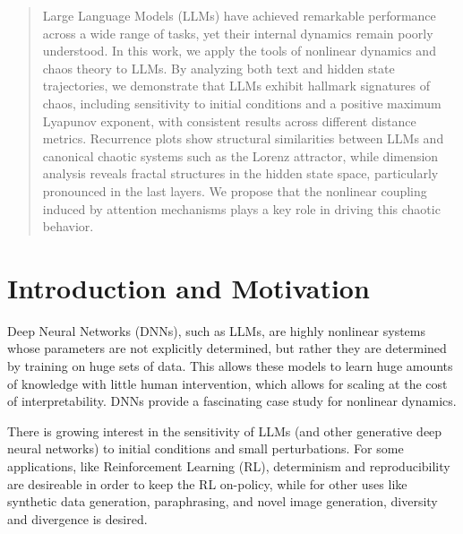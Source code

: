 \documentclass[a4paper,12pt]{article}
\begin{document}
\begin{abstract}
    Large Language Models (LLMs) have achieved remarkable performance across a wide range of tasks, yet their internal dynamics remain poorly understood. In this work, we apply the tools of nonlinear dynamics and chaos theory to LLMs. By analyzing both text and hidden state trajectories, we demonstrate that LLMs exhibit hallmark signatures of chaos, including sensitivity to initial conditions and a positive maximum Lyapunov exponent, with consistent results across different distance metrics. Recurrence plots show structural similarities between LLMs and canonical chaotic systems such as the Lorenz attractor, while dimension analysis reveals fractal structures in the hidden state space, particularly pronounced in the last layers. We propose that the nonlinear coupling induced by attention mechanisms plays a key role in driving this chaotic behavior. 
\end{abstract}
\newpage
{
  \hypersetup{linkcolor=black}
  \tableofcontents
}
\newpage

\section{Introduction and Motivation}
\label{sec:introduction}

Deep Neural Networks (DNNs), such as LLMs, are highly nonlinear systems whose parameters are not explicitly determined, but rather they are determined by training on huge sets of data.
This allows these models to learn huge amounts of knowledge with little human intervention, which allows for scaling at the cost of interpretability.
DNNs provide a fascinating case study for nonlinear dynamics.

There is growing interest in the sensitivity of LLMs (and other generative deep neural networks) to initial conditions and small perturbations. For some applications, like Reinforcement Learning (RL), determinism and reproducibility are desireable in order to keep the RL on-policy, while for other uses like synthetic data generation, paraphrasing, and novel image generation, diversity and divergence is desired.
\end{document}
